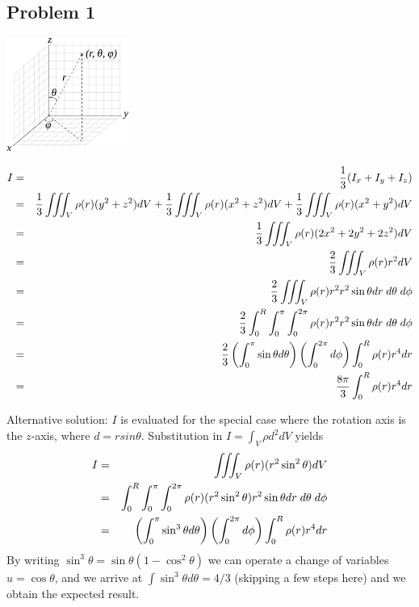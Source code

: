 
\subsection{Problem 1}

\begin{center}
\includegraphics[width=4cm]{images/sphcoord}
\end{center}

\begin{eqnarray}
I 
&=& \frac{1}{3} (I_x + I_y + I_z ) \nonumber\\
&=& 
\frac{1}{3} \iiint_V \rho(r) (y^2+z^2) dV +
\frac{1}{3} \iiint_V \rho(r) (x^2+z^2) dV +
\frac{1}{3} \iiint_V \rho(r) (x^2+y^2) dV \nonumber\\
&=&
\frac{1}{3} \iiint_V \rho(r) (2x^2 + 2y^2+2z^2) dV \nonumber\\
&=&
\frac{2}{3} \iiint_V \rho(r) r^2 dV \nonumber\\
&=& \frac{2}{3} \iiint_V \rho(r) r^2 r^2 \sin\theta dr \; d\theta \; d\phi \nonumber\\
&=& \frac{2}{3} \int_0^R \int_0^\pi \int_0^{2\pi}    \rho(r) r^2 r^2 \sin\theta dr \; d\theta \; d\phi \nonumber\\
&=& \frac{2}{3} \left(\int_0^\pi \sin\theta d\theta \right)
\left( \int_0^{2\pi} d\phi \right)  \int_0^R   \rho(r) r^4 dr \nonumber\\
&=& \frac{8\pi}{3}  \int_0^R   \rho(r) r^4 dr 
\end{eqnarray}

Alternative solution:
$I$ is evaluated for the special case where the rotation axis is the $z$-axis, 
where $d = r sin\theta$. 
Substitution in $I=\int_V \rho d^2 dV$ yields
\begin{eqnarray}
I
&=& \iiint_V \rho(r) (r^2 \sin^2\theta ) dV  \nonumber\\
&=& \int_0^R \int_0^\pi \int_0^{2\pi} \rho(r) ( r^2 \sin^2\theta ) r^2 \sin\theta dr \; d\theta \; d\phi \nonumber\\
&=& \left(\int_0^\pi \sin^3 \theta d\theta \right)
\left( \int_0^{2\pi} d\phi \right)  \int_0^R   \rho(r) r^4 dr \nonumber
\end{eqnarray}
By writing $\sin^3\theta = \sin\theta (1-\cos^2\theta)$ we can operate a change of variables $u=\cos \theta$,
and we arrive at $\int \sin^3 \theta d\theta=4/3$ (skipping a few steps here) 
and we obtain the expected result.






